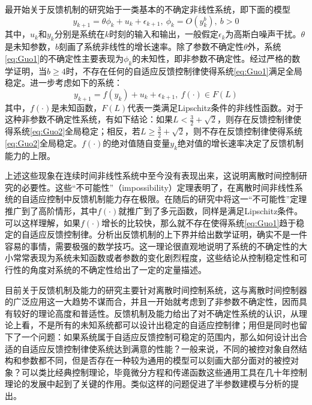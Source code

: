 最开始关于反馈机制的研究始于一类基本的不确定非线性系统，即下面的模型
\begin{equation}%
\label{eq:Guo1}
y_{k+1} = \theta \phi_{k} + u_{k} + \epsilon_{k+1},\ \phi_{k}=O(y_{k}^{b}),\ b>0
\end{equation}
其中，$u_{k}$和$y_{k}$分别是系统在$k$时刻的输入和输出，一般假定$\epsilon_{k}$为高斯白噪声干扰。$\theta$是未知参数，$b$刻画了系统非线性的增长速率。除了参数不确定性$\theta$外，系统\eqref{eq:Guo1}的不确定性主要表现为$\phi_{k}$的未知性，即非参数不确定性。经过严格的数学证明，当$b\geq4$时，不存在任何的自适应反馈控制律使得系统\eqref{eq:Guo1}满足全局稳定。进一步考虑如下的系统：
\begin{equation}%
\label{eq:Guo2}
y_{k+1} = f(y_{k}) + u_{k} + \epsilon_{k+1},\ f(\cdot)\in F(L)
\end{equation}
其中，$f(\cdot)$是未知函数，$F(L)$代表一类满足Lipschitz条件的非线性函数。对于这种非参数不确定性系统，有如下结论：如果$L<\frac32+\sqrt{2}$，则存在反馈控制律使得系统\eqref{eq:Guo2}全局稳定；相反，若$L\geq\frac32+\sqrt{2}$，则不存在反馈控制律使得系统\eqref{eq:Guo2}全局稳定。$f(\cdot)$的绝对值随自变量$y_{k}$绝对值的增长速率决定了反馈机制能力的上限。

上述这些现象在连续时间非线性系统中至今没有表现出来，这说明离散时间控制研究的必要性。这些“不可能性”（impossibility）定理表明了，在离散时间非线性系统的自适应控制中反馈机制能力存在极限。在随后的研究中将这一“不可能性”定理推广到了高阶情形，其中$f(\cdot)$就推广到了多元函数，同样是满足Lipschitz条件。可以这样理解，如果$f(\cdot)$增长的比较快，那么就不存在使得系统\eqref{eq:Guo1}趋于稳定的自适应反馈控制律。分析出反馈机制的上下界并给出数学证明，确实不是一件容易的事情，需要极强的数学技巧。这一理论很直观地说明了系统的不确定性的大小常常表现为系统未知函数或者参数的变化剧烈程度，这些结论从控制稳定性和可行性的角度对系统的不确定性给出了一定的定量描述。

目前关于反馈机制及能力的研究主要针对离散时间控制系统，这与离散时间控制器的广泛应用这一大趋势不谋而合，并且一开始就考虑到了非参数不确定性，因而具有较好的理论高度和普适性。反馈机制及能力给出了对不确定性系统的认识，从理论上看，不是所有的未知系统都可以设计出稳定的自适应控制律；用但是同时也留下了一个问题：如果系统属于自适应反馈控制可稳定的范围内，那么如何设计出合适的自适应反馈控制律使系统达到满意的性能？一般来说，不同的被控对象自然结构和参数都不同，但是否存在一种较为通用的模型可以刻画大部分面对的被控对象？可以类比经典控制理论，毕竟微分方程和传递函数这些通用工具在几十年控制理论的发展中起到了关键的作用。类似这样的问题促进了半参数建模与分析的提出。


